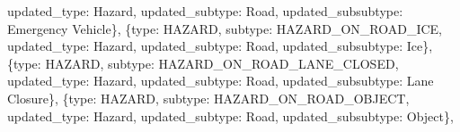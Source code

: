 \documentclass[
  letterpaper,
  DIV=11,
  numbers=noendperiod]{scrartcl}
\newenvironment{Shaded}{\begin{snugshade}}{\end{snugshade}}
\newcommand{\NormalTok}[1]{\textcolor[rgb]{0.00,0.23,0.31}{#1}}
\newcommand{\StringTok}[1]{\textcolor[rgb]{0.13,0.47,0.30}{#1}}
\begin{document}
\begin{Shaded}
\begin{Highlighting}[]
     \StringTok{\textquotesingle{}updated\_type\textquotesingle{}}\NormalTok{: }\StringTok{\textquotesingle{}Hazard\textquotesingle{}}\NormalTok{, }\StringTok{\textquotesingle{}updated\_subtype\textquotesingle{}}\NormalTok{: }\StringTok{\textquotesingle{}Road\textquotesingle{}}\NormalTok{, }\StringTok{\textquotesingle{}updated\_subsubtype\textquotesingle{}}\NormalTok{: }\StringTok{\textquotesingle{}Emergency Vehicle\textquotesingle{}}\NormalTok{\},}
\NormalTok{    \{}\StringTok{\textquotesingle{}type\textquotesingle{}}\NormalTok{: }\StringTok{\textquotesingle{}HAZARD\textquotesingle{}}\NormalTok{, }\StringTok{\textquotesingle{}subtype\textquotesingle{}}\NormalTok{: }\StringTok{\textquotesingle{}HAZARD\_ON\_ROAD\_ICE\textquotesingle{}}\NormalTok{, }
     \StringTok{\textquotesingle{}updated\_type\textquotesingle{}}\NormalTok{: }\StringTok{\textquotesingle{}Hazard\textquotesingle{}}\NormalTok{, }\StringTok{\textquotesingle{}updated\_subtype\textquotesingle{}}\NormalTok{: }\StringTok{\textquotesingle{}Road\textquotesingle{}}\NormalTok{, }\StringTok{\textquotesingle{}updated\_subsubtype\textquotesingle{}}\NormalTok{: }\StringTok{\textquotesingle{}Ice\textquotesingle{}}\NormalTok{\},}
\NormalTok{    \{}\StringTok{\textquotesingle{}type\textquotesingle{}}\NormalTok{: }\StringTok{\textquotesingle{}HAZARD\textquotesingle{}}\NormalTok{, }\StringTok{\textquotesingle{}subtype\textquotesingle{}}\NormalTok{: }\StringTok{\textquotesingle{}HAZARD\_ON\_ROAD\_LANE\_CLOSED\textquotesingle{}}\NormalTok{, }
     \StringTok{\textquotesingle{}updated\_type\textquotesingle{}}\NormalTok{: }\StringTok{\textquotesingle{}Hazard\textquotesingle{}}\NormalTok{, }\StringTok{\textquotesingle{}updated\_subtype\textquotesingle{}}\NormalTok{: }\StringTok{\textquotesingle{}Road\textquotesingle{}}\NormalTok{, }\StringTok{\textquotesingle{}updated\_subsubtype\textquotesingle{}}\NormalTok{: }\StringTok{\textquotesingle{}Lane Closure\textquotesingle{}}\NormalTok{\},}
\NormalTok{    \{}\StringTok{\textquotesingle{}type\textquotesingle{}}\NormalTok{: }\StringTok{\textquotesingle{}HAZARD\textquotesingle{}}\NormalTok{, }\StringTok{\textquotesingle{}subtype\textquotesingle{}}\NormalTok{: }\StringTok{\textquotesingle{}HAZARD\_ON\_ROAD\_OBJECT\textquotesingle{}}\NormalTok{, }
     \StringTok{\textquotesingle{}updated\_type\textquotesingle{}}\NormalTok{: }\StringTok{\textquotesingle{}Hazard\textquotesingle{}}\NormalTok{, }\StringTok{\textquotesingle{}updated\_subtype\textquotesingle{}}\NormalTok{: }\StringTok{\textquotesingle{}Road\textquotesingle{}}\NormalTok{, }\StringTok{\textquotesingle{}updated\_subsubtype\textquotesingle{}}\NormalTok{: }\StringTok{\textquotesingle{}Object\textquotesingle{}}\NormalTok{\},}

\end{Highlighting}
\end{Shaded}
\end{document}

